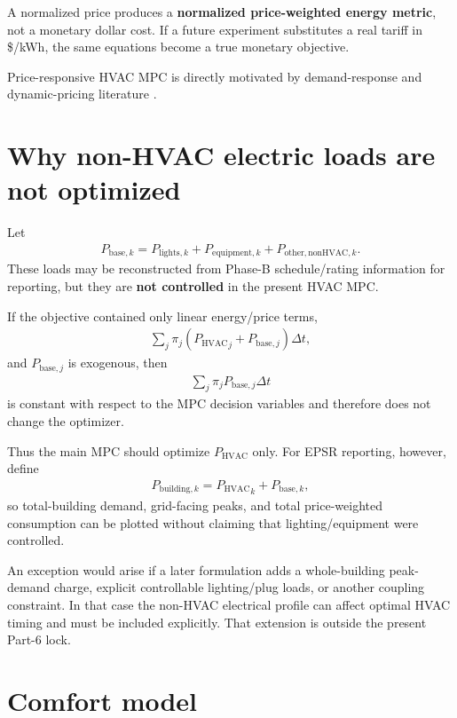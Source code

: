 \documentclass[11pt]{article}
\newcommand{\PHVAC}{P_{\mathrm{HVAC}}}
\newcommand{\dt}{\Delta t}
\begin{document}
A normalized price produces a \textbf{normalized price-weighted energy metric}, not a monetary
dollar cost.  If a future experiment substitutes a real tariff in \$/kWh, the same equations
become a true monetary objective.

Price-responsive HVAC MPC is directly motivated by demand-response and dynamic-pricing
literature \citep{avci2013price,amin2020price,zanetti2025flex}.

\section{Why non-HVAC electric loads are not optimized}

Let
\begin{align}
P_{\mathrm{base},k}
=
P_{\mathrm{lights},k}
+
P_{\mathrm{equipment},k}
+
P_{\mathrm{other,nonHVAC},k}.
\tag{6.60}
\end{align}
These loads may be reconstructed from Phase-B schedule/rating information for reporting, but they
are \textbf{not controlled} in the present HVAC MPC.

If the objective contained only linear energy/price terms,
\begin{align}
\sum_j
\pi_j
\left(
{\PHVAC}_j
+
P_{\mathrm{base},j}
\right)\dt,
\end{align}
and \(P_{\mathrm{base},j}\) is exogenous, then
\begin{align}
\sum_j\pi_jP_{\mathrm{base},j}\dt
\end{align}
is constant with respect to the MPC decision variables and therefore does not change the optimizer.

Thus the main MPC should optimize \(\PHVAC\) only.  For EPSR reporting, however, define
\begin{align}
\boxed{
P_{\mathrm{building},k}
=
{\PHVAC}_k
+
P_{\mathrm{base},k},
}
\tag{6.61}
\end{align}
so total-building demand, grid-facing peaks, and total price-weighted consumption can be plotted
without claiming that lighting/equipment were controlled.

An exception would arise if a later formulation adds a whole-building peak-demand charge,
explicit controllable lighting/plug loads, or another coupling constraint.  In that case the
non-HVAC electrical profile can affect optimal HVAC timing and must be included explicitly.
That extension is outside the present Part-6 lock.

\section{Comfort model}
\end{document}
